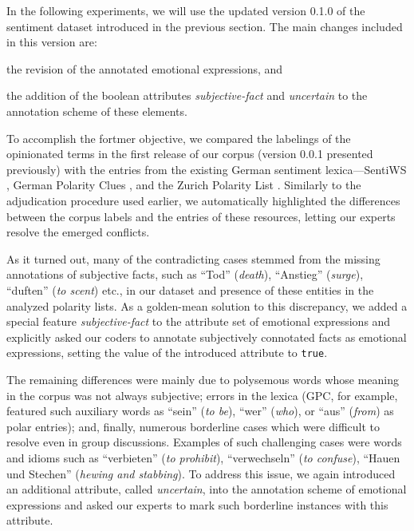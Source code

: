 In the following experiments, we will use the updated version 0.1.0 of
the sentiment dataset introduced in the previous section.  The main
changes included in this version are:
\begin{inparaenum}
  \item the revision of the annotated emotional expressions, and
  \item the addition of the boolean attributes \emph{subjective-fact}
    and \emph{uncertain} to the annotation scheme of these elements.
\end{inparaenum}

To accomplish the fortmer objective, we compared the labelings of the
opinionated terms in the first release of our corpus (version 0.0.1
presented previously) with the entries from the existing German
sentiment lexica---SentiWS \cite{Remus:10}, German Polarity Clues
\cite{Waltinger:10}, and the Zurich Polarity List \cite{Clematide:10}.
Similarly to the adjudication procedure used earlier, we automatically
highlighted the differences between the corpus labels and the entries
of these resources, letting our experts resolve the emerged conflicts.

As it turned out, many of the contradicting cases stemmed from the
missing annotations of subjective facts, such as ``Tod''
(\emph{death}), ``Anstieg'' (\emph{surge}), ``duften'' (\emph{to
  scent}) etc., in our dataset and presence of these entities in the
analyzed polarity lists.  As a golden-mean solution to this
discrepancy, we added a special feature \emph{subjective-fact} to the
attribute set of emotional expressions and explicitly asked our coders
to annotate subjectively connotated facts as emotional expressions,
setting the value of the introduced attribute to \texttt{true}.

The remaining differences were mainly due to polysemous words whose
meaning in the corpus was not always subjective; errors in the lexica
(GPC, for example, featured such auxiliary words as ``sein'' (\emph{to
  be}), ``wer'' (\emph{who}), or ``aus'' (\emph{from}) as polar
entries); and, finally, numerous borderline cases which were difficult
to resolve even in group discussions.  Examples of such challenging
cases were words and idioms such as ``verbieten'' (\emph{to
  prohibit}), ``verwechseln'' (\emph{to confuse}), ``Hauen und
Stechen'' (\emph{hewing and stabbing}).  To address this issue, we
again introduced an additional attribute, called \emph{uncertain},
into the annotation scheme of emotional expressions and asked our
experts to mark such borderline instances with this attribute.

